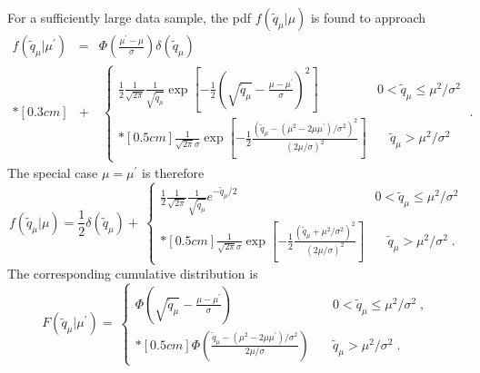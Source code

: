 \documentclass{cernrep}
\begin{document}
For a sufficiently large data sample,  the pdf $f(\tilde{q}_{\mu} | \mu)$ is found to approach
\begin{eqnarray}
\label{eq:ftildeqmmp} 
f(\tilde{q}_{\mu}|\mu^{\prime}) & = & 
\Phi \left( \frac{\mu^{\prime} - \mu}{\sigma} \right) 
\delta (\tilde{q}_{\mu}) \nonumber \\*[0.3 cm] 
& + &
 \: \left\{ \! \! \begin{array}{lll}
\frac{1}{2} \frac{1}{\sqrt{2 \pi}} \frac{1}{\sqrt{\tilde{q}_{\mu}}}
\exp \left[ -\frac{1}{2} \left( \sqrt{\tilde{q}_{\mu}} -
\frac{\mu - \mu^{\prime}}{\sigma} \right)^2 \right]
                 & 0 < \tilde{q}_{\mu} \le \mu^2/\sigma^{2}  \\*[0.5 cm]
\frac{1}{\sqrt{2 \pi} \sigma} \exp \left[
-\frac{1}{2} \frac{ (\tilde{q}_{\mu} - 
(\mu^2 - 2 \mu \mu^{\prime})/\sigma^{2} )^2 }
{(2 \mu/\sigma)^2} \right] 
                 &  \quad \tilde{q}_{\mu} > \mu^2/\sigma^{2} 
              \end{array}
       \right.
\;.
\end{eqnarray}
The special case $\mu = \mu^{\prime}$ is therefore
\begin{equation}
\label{eq:ftildeqmm} 
f(\tilde{q}_{\mu}|\mu) = 
\frac{1}{2} \delta (\tilde{q}_{\mu}) +
 \: \left\{ \! \! \begin{array}{lll}
\frac{1}{2} \frac{1}{\sqrt{2 \pi}} \frac{1}{\sqrt{\tilde{q}_{\mu}}}
e^{- \tilde{q}_{\mu}/2}
                 & 0 < \tilde{q}_{\mu} \le \mu^2/\sigma^2  \\*[0.5 cm]
\frac{1}{\sqrt{2 \pi} \sigma} \exp \left[
-\frac{1}{2} \frac{ (\tilde{q}_{\mu} + \mu^2/\sigma^2 )^2 }
{(2 \mu/\sigma)^2} \right] 
                 &  \quad \tilde{q}_{\mu} > \mu^2/\sigma^2 \;.
              \end{array}
       \right.
\end{equation}
The corresponding cumulative distribution is
\begin{equation}
\label{eq:tildeqmmpcdf} 
F(\tilde{q}_{\mu}|\mu^{\prime}) = 
 \: \left\{ \! \! \begin{array}{lll}
\Phi\left( \sqrt{\tilde{q}_{\mu}} - 
\frac{\mu - \mu^{\prime}}{\sigma} \right)
                 & \quad 0 < \tilde{q}_{\mu} \le \mu^2/\sigma^{2}  
\;, \\*[0.5 cm]
\Phi \left( \frac{ \tilde{q}_{\mu} - 
(\mu^2 - 2 \mu \mu^{\prime})/\sigma^{2}}
{2\mu/\sigma} \right)
                 &  \quad \tilde{q}_{\mu} > \mu^2/\sigma^{2} \;.
              \end{array}
       \right.
\end{equation}
\end{document}
